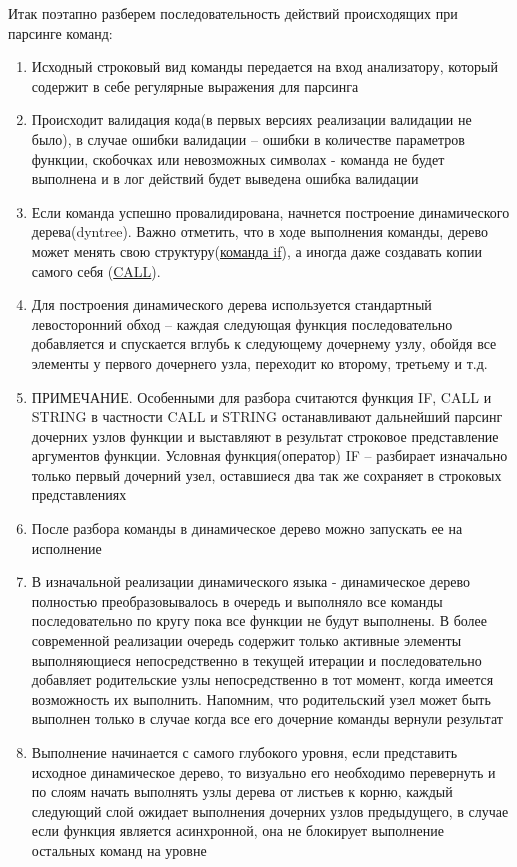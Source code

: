 \documentclass[../index.tex]{subfiles}
\begin{document}
Итак поэтапно разберем последовательность действий происходящих при парсинге команд:
\begin{enumerate}
    \item Исходный строковый вид команды передается на вход анализатору, который содержит в себе регулярные выражения для парсинга
    \item Происходит валидация кода(в первых версиях реализации валидации не было), в случае ошибки валидации -- ошибки в количестве параметров функции, скобочках или невозможных символах - команда не будет выполнена и в лог действий будет выведена ошибка валидации
    \item Если команда успешно провалидирована, начнется построение динамического дерева(\gls{dyntree}). Важно отметить, что в ходе выполнения команды, дерево может менять свою структуру(\hyperref[sec:fif]{команда if}), а иногда даже создавать копии самого себя (\hyperref[sec:fcall]{CALL}). 
    \item Для построения динамического дерева используется стандартный левосторонний обход -- каждая следующая функция последовательно добавляется и спускается вглубь к следующему дочернему узлу, обойдя все элементы у первого дочернего узла, переходит ко второму, третьему и т.д.
    \item ПРИМЕЧАНИЕ. Особенными для разбора считаются функция IF, CALL и STRING в частности CALL и STRING останавливают дальнейший парсинг дочерних узлов функции и выставляют в результат строковое представление аргументов функции. Условная функция(оператор) IF -- разбирает изначально только первый дочерний узел, оставшиеся два так же сохраняет в строковых представлениях
    \item После разбора команды в динамическое дерево можно запускать ее на исполнение 
    \item В изначальной реализации динамического языка - динамическое дерево полностью преобразовывалось в очередь и выполняло все команды последовательно по кругу пока все функции не будут выполнены. В более современной реализации очередь содержит только активные элементы выполняющиеся непосредственно в текущей итерации и последовательно добавляет родительские узлы непосредственно в тот момент, когда имеется возможность их выполнить. Напомним, что родительский узел может быть выполнен только в случае когда все его дочерние команды вернули результат
    \item Выполнение начинается с самого глубокого уровня, если представить исходное динамическое дерево, то визуально его необходимо перевернуть и по слоям начать выполнять узлы дерева от листьев к корню, каждый следующий слой ожидает выполнения дочерних узлов предыдущего, в случае если функция является асинхронной, она не блокирует выполнение остальных команд на уровне

\end{enumerate}
\end{document}
